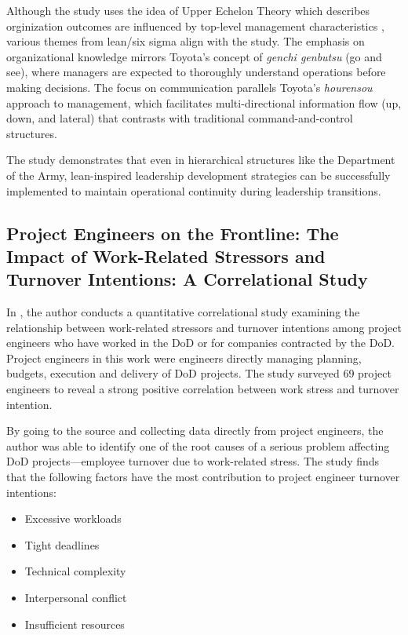 \documentclass{article}
\begin{document}
			Although the study uses the idea of Upper Echelon Theory which describes orginization outcomes are influenced by top-level management characteristics \cite{uppere}, various themes from lean/six sigma align with the study.
			The emphasis on organizational knowledge mirrors Toyota's concept of \textit{genchi genbutsu} (go and see), where managers are expected to thoroughly understand operations before making decisions. 
			The focus on communication parallels Toyota's \textit{hourensou} approach to management, which facilitates multi-directional information flow (up, down, and lateral) that contrasts with traditional command-and-control structures.

			The study demonstrates that even in hierarchical structures like the Department of the Army, lean-inspired leadership development strategies can be successfully implemented to maintain operational continuity during leadership transitions.


		\subsection{Project Engineers on the Frontline: The Impact of Work-Related Stressors and Turnover Intentions: A Correlational Study \cite{Turner2024}}

			In \cite{Turner2024}, the author conducts a quantitative correlational study examining the relationship between work-related stressors and turnover intentions among project engineers who have worked in the DoD or for companies contracted by the DoD. 
			Project engineers in this work were engineers directly managing planning, budgets, execution and delivery of DoD projects.
			The study surveyed 69 project engineers to reveal a strong positive correlation between work stress and turnover intention.

			By going to the source and collecting data directly from project engineers, the author was able to identify one of the root causes of a serious problem affecting DoD projects—employee turnover due to work-related stress. 
			The study finds that the following factors have the most contribution to project engineer turnover intentions:

			\begin{itemize}
				\item Excessive workloads
				\item Tight deadlines
				\item Technical complexity
				\item Interpersonal conflict
				\item Insufficient resources
			\end{itemize}
\end{document}
